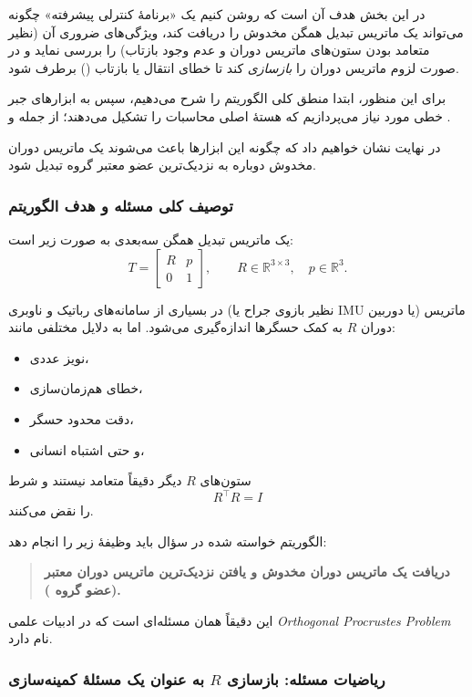\documentclass{article}
\begin{document}
در این بخش هدف آن است که روشن کنیم یک «برنامهٔ کنترلی پیشرفته» چگونه می‌تواند
یک ماتریس تبدیل همگن مخدوش را دریافت کند،
ویژگی‌های ضروری آن (نظیر متعامد بودن ستون‌های ماتریس دوران و عدم وجود بازتاب)
را بررسی نماید
و در صورت لزوم ماتریس دوران را \emph{بازسازی} کند تا خطای انتقال یا بازتاب () برطرف شود.

برای این منظور، ابتدا منطق کلی الگوریتم را شرح می‌دهیم،
سپس به ابزارهای جبر خطی مورد نیاز می‌پردازیم
که هستهٔ اصلی محاسبات را تشکیل می‌دهند؛
از جمله 
و
.

در نهایت نشان خواهیم داد که چگونه این ابزارها باعث می‌شوند
یک ماتریس دوران مخدوش دوباره به نزدیک‌ترین عضو معتبر گروه  تبدیل شود.


\subsubsection{ توصیف کلی مسئله و هدف الگوریتم}
یک ماتریس تبدیل همگن سه‌بعدی به صورت زیر است:
\[
T =
\begin{bmatrix}
	R & p\\
	0 & 1
\end{bmatrix},
\qquad
R\in\mathbb{R}^{3\times 3},\quad
p\in\mathbb{R}^3.
\]

در بسیاری از سامانه‌های رباتیک و ناوبری (نظیر بازوی جراح یا IMU یا دوربین)
ماتریس دوران $R$ به کمک حسگرها اندازه‌گیری می‌شود.
اما به دلایل مختلفی مانند:
\begin{itemize}
	\item نویز عددی،
	\item خطای هم‌زمان‌سازی،
	\item دقت محدود حسگر،
	\item و حتی اشتباه انسانی،
\end{itemize}
ستون‌های $R$ دیگر دقیقاً متعامد نیستند و شرط
\[
R^\top R = I
\]
را نقض می‌کنند.

الگوریتم خواسته شده در سؤال باید وظیفهٔ زیر را انجام دهد:
\begin{quote}
	\textbf{دریافت یک ماتریس دوران مخدوش و یافتن نزدیک‌ترین ماتریس دوران معتبر (عضو گروه ).}
\end{quote}

این دقیقاً همان مسئله‌ای است که در ادبیات علمی \textit{Orthogonal Procrustes Problem} نام دارد.


\subsubsection{ ریاضیات مسئله: بازسازی $R$ به عنوان یک مسئلهٔ کمینه‌سازی}
\end{document}
